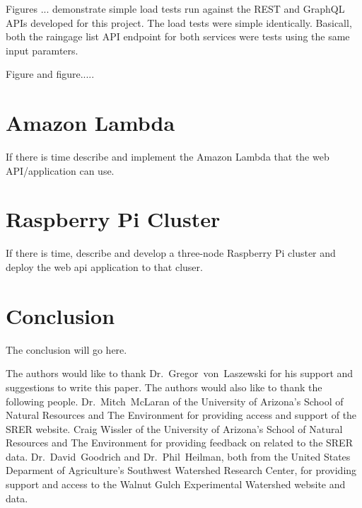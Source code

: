 Figures ... demonstrate simple load tests run against the REST and GraphQL APIs 
developed for this project.  The load tests were simple identically.  Basicall, 
both the raingage list API endpoint for both services were tests using the same 
input paramters.

Figure and figure.....

\section{Amazon Lambda}
If there is time describe and implement the Amazon Lambda that the web 
API/application can use.

\section{Raspberry Pi Cluster}
If there is time, describe and develop a three-node Raspberry Pi cluster and 
deploy the web api application to that cluser.

\section{Conclusion}
The conclusion will go here.

\begin{acks}
The authors would like to thank Dr.~Gregor~von~Laszewski for his support 
and suggestions to write this paper.  The authors would also like to thank 
the following people.  Dr.~Mitch~McLaran of the University of Arizona's School 
of Natural Resources and The Environment for providing access and support of 
the SRER website.  Craig Wissler of the University of Arizona's School of 
Natural Resources and The Environment for providing feedback on related to the 
SRER data.  Dr.~David~Goodrich and Dr.~Phil~Heilman, both from the United 
States Deparment of Agriculture's Southwest Watershed Research Center, for 
providing support and access to the Walnut Gulch Experimental Watershed website 
and data.
\end{acks}


 
